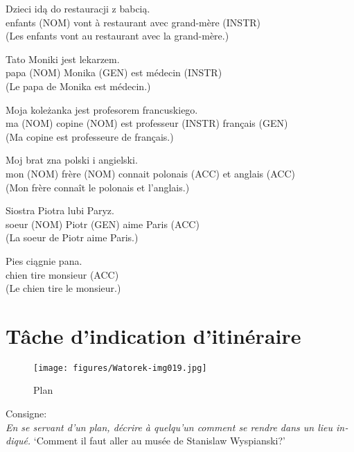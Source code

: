 \documentclass[output=paper]{langscibook}
\begin{document}
\begin{otherlanguage}{french}
\begin{paperappendix}
\begin{exe}
\gll Dzieci     idą   do   restauracji   z   babcią.\\
    {enfants (NOM)} vont   à   restaurant   avec   {grand-mère (INSTR)}\\
\glt (Les enfants vont au restaurant avec la grand-mère.)

\gll Tato     Moniki     jest   lekarzem. \\
    {papa (NOM)} {Monika (GEN)}   est   {médecin (INSTR)}\\
\glt (Le papa de Monika est médecin.)

\gll Moja     koleżanka   jest   profesorem     francuskiego.\\
      {ma (NOM)}     {copine (NOM)}   est   {professeur (INSTR)}   {français (GEN)}\\
\glt (Ma copine est professeure de français.)

\gll Moj     brat     zna        polski     i   angielski.\\
      {mon (NOM)}   {frère (NOM)}   connait     {polonais (ACC)}   et   {anglais (ACC)}\\
\glt (Mon frère connaît le polonais et l’anglais.)

\gll Siostra     Piotra     lubi   Paryz.\\
      {soeur (NOM)}   {Piotr (GEN)}   aime   {Paris (ACC)}\\
\glt (La soeur de Piotr aime Paris.)

\gll Pies     ciągnie     pana.\\
     chien  tire     {monsieur (ACC)}\\
\glt (Le chien tire le monsieur.)
\end{exe}


\section{Tâche d’indication d’itinéraire}

\begin{figure}[H]
\texttt{[image: figures/Watorek-img019.jpg]}
\caption{Plan}
\end{figure}

\ea Consigne:\\
\textit{En se servant d’un plan, décrire à quelqu’un comment se rendre dans un lieu indiqué.}
\glt `Comment il faut aller au musée de Stanislaw Wyspianski?'
\z

\end{paperappendix}
\end{otherlanguage}
\end{document}
